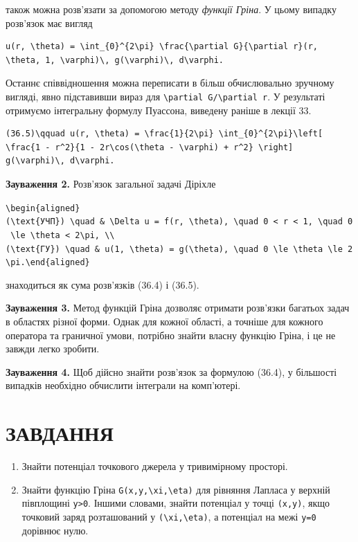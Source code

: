 \documentclass[
  ukrainian,
]{article}
\begin{document}
також можна розв'язати за допомогою методу \emph{функції Гріна}. У цьому
випадку розв'язок має вигляд

\begin{verbatim}
u(r, \theta) = \int_{0}^{2\pi} \frac{\partial G}{\partial r}(r, \theta, 1, \varphi)\, g(\varphi)\, d\varphi.
\end{verbatim}

Останнє співвідношення можна переписати в більш обчислювально зручному
вигляді, явно підставивши вираз для
\texttt{\textbackslash{}partial\ G/\textbackslash{}partial\ r}. У
результаті отримуємо інтегральну формулу Пуассона, виведену раніше в
лекції 33.

\begin{verbatim}
(36.5)\qquad u(r, \theta) = \frac{1}{2\pi} \int_{0}^{2\pi}\left[ \frac{1 - r^2}{1 - 2r\cos(\theta - \varphi) + r^2} \right] g(\varphi)\, d\varphi.
\end{verbatim}

\textbf{Зауваження 2.} Розв'язок загальної задачі Діріхле

\texttt{\textbackslash{}begin\{aligned\}(\textbackslash{}text\{УЧП\})\ \textbackslash{}quad\ \&\ \textbackslash{}Delta\ u\ =\ f(r,\ \textbackslash{}theta),\ \textbackslash{}quad\ 0\ \textless{}\ r\ \textless{}\ 1,\ \textbackslash{}quad\ 0\ \textbackslash{}le\ \textbackslash{}theta\ \textless{}\ 2\textbackslash{}pi,\ \textbackslash{}\textbackslash{}(\textbackslash{}text\{ГУ\})\ \textbackslash{}quad\ \&\ u(1,\ \textbackslash{}theta)\ =\ g(\textbackslash{}theta),\ \textbackslash{}quad\ 0\ \textbackslash{}le\ \textbackslash{}theta\ \textbackslash{}le\ 2\textbackslash{}pi.\textbackslash{}end\{aligned\}}

знаходиться як сума розв'язків (36.4) і (36.5).

\textbf{Зауваження 3.} Метод функцій Гріна дозволяє отримати розв'язки
багатьох задач в областях різної форми. Однак для кожної області, а
точніше для кожного оператора та граничної умови, потрібно знайти власну
функцію Гріна, і це не завжди легко зробити.

\textbf{Зауваження 4.} Щоб дійсно знайти розв'язок за формулою (36.4), у
більшості випадків необхідно обчислити інтеграли на комп'ютері.

\section{ЗАВДАННЯ}\label{ux437ux430ux432ux434ux430ux43dux43dux44f-8}

\begin{enumerate}
\def\labelenumi{\arabic{enumi}.}
\item
  Знайти потенціал точкового джерела у тривимірному просторі.
\item
  Знайти функцію Гріна
  \texttt{G(x,y,\textbackslash{}xi,\textbackslash{}eta)} для рівняння
  Лапласа у верхній півплощині \texttt{y\textgreater{}0}. Іншими
  словами, знайти потенціал у точці \texttt{(x,y)}, якщо точковий заряд
  розташований у \texttt{(\textbackslash{}xi,\textbackslash{}eta)}, а
  потенціал на межі \texttt{y=0} дорівнює нулю.
\end{enumerate}
\end{document}
